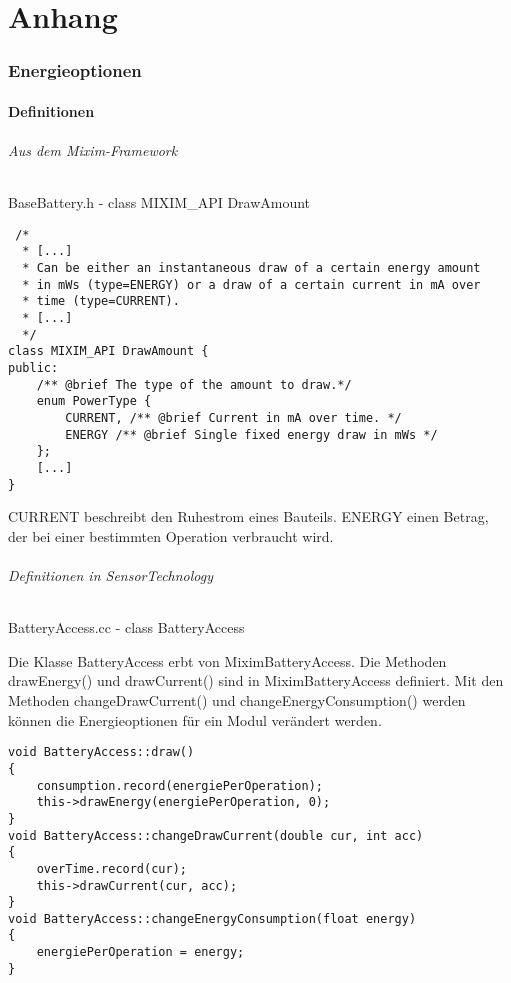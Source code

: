 \part*{Anhang}
\appendix
%

\section*{Energieoptionen}
\subsection*{Definitionen}

\paragraph{Aus dem Mixim-Framework} BaseBattery.h - class MIXIM\_API DrawAmount

\begin{minipage}{\textwidth}
\begin{lstlisting}
 /* 
  * [...]
  * Can be either an instantaneous draw of a certain energy amount
  * in mWs (type=ENERGY) or a draw of a certain current in mA over
  * time (type=CURRENT).
  * [...]
  */
class MIXIM_API DrawAmount {
public:
	/** @brief The type of the amount to draw.*/
    enum PowerType {
	    CURRENT, /** @brief Current in mA over time. */
	    ENERGY /** @brief Single fixed energy draw in mWs */
    };
    [...]
}
\end{lstlisting}
\end{minipage}

CURRENT beschreibt den Ruhestrom eines Bauteils. ENERGY einen Betrag, der bei einer bestimmten Operation verbraucht wird.

\paragraph{Definitionen in SensorTechnology} BatteryAccess.cc - class BatteryAccess

Die Klasse BatteryAccess erbt von MiximBatteryAccess. Die Methoden drawEnergy() und drawCurrent() sind in MiximBatteryAccess definiert. Mit den Methoden changeDrawCurrent() und changeEnergyConsumption() werden können die Energieoptionen für ein Modul verändert werden.

\begin{minipage}{\textwidth}
\begin{lstlisting}
void BatteryAccess::draw()
{
    consumption.record(energiePerOperation);
    this->drawEnergy(energiePerOperation, 0);
}
void BatteryAccess::changeDrawCurrent(double cur, int acc)
{
    overTime.record(cur);
    this->drawCurrent(cur, acc);
}
void BatteryAccess::changeEnergyConsumption(float energy)
{
    energiePerOperation = energy;
}
\end{lstlisting}
\end{minipage}

